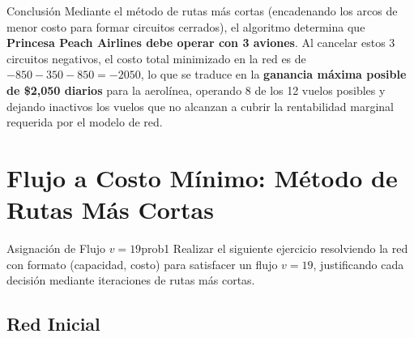 \documentclass[10pt,a4paper]{article}
\begin{document}
\begin{alerta}{Conclusión}
Mediante el método de rutas más cortas (encadenando los arcos de menor costo para formar circuitos cerrados), el algoritmo determina que \textbf{Princesa Peach Airlines debe operar con 3 aviones}. 
Al cancelar estos 3 circuitos negativos, el costo total minimizado en la red es de $-850 - 350 - 850 = -2050$, lo que se traduce en la \textbf{ganancia máxima posible de \$2,050 diarios} para la aerolínea, operando 8 de los 12 vuelos posibles y dejando inactivos los vuelos que no alcanzan a cubrir la rentabilidad marginal requerida por el modelo de red.
\end{alerta}

\newpage


\section{Flujo a Costo Mínimo: Método de Rutas Más Cortas}

\begin{ejercicio}{Asignación de Flujo $v=19$}{prob1}
Realizar el siguiente ejercicio resolviendo la red con formato (capacidad, costo) para satisfacer un flujo $v=19$, justificando cada decisión mediante iteraciones de rutas más cortas.
\end{ejercicio}


\subsection{Red Inicial}
\end{document}
